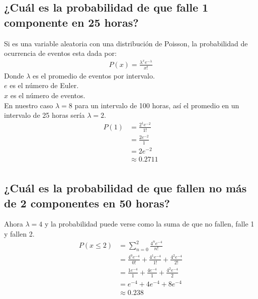 \documentclass[12pt]{article}
\begin{document}
\subsection{¿Cuál es la probabilidad de que falle 1 componente en 25 horas?}
Si es una variable aleatoria con una distribución de Poisson, la probabilidad de ocurrencia de eventos esta dada por:
\begin{equation}
	\begin{split}
		P(x)=\frac{\lambda^xe^{-\lambda}}{x!}
	\end{split}
\end{equation}
Donde $\lambda$ es el promedio de eventos por intervalo.\\
$e$ es el número de Euler.\\
$x$ es el número de eventos.\\
En nuestro caso $\lambda = 8$ para un intervalo de 100 horas, así el promedio en un intervalo de 25 horas sería $\lambda=2$.\\
\begin{equation}
	\begin{split}
	P(1) &= \frac{2^1e^{-2}}{1!}\\
	&= \frac{2e^{-2}}{1}\\
	&= 2e^{-2}\\
	&\approx 0.2711\\
	\end{split}
\end{equation}
\subsection{¿Cuál es la probabilidad de que fallen no más de 2 componentes en 50 horas?}
Ahora $\lambda=4$ y la probabilidad puede verse como la suma de que no fallen, falle 1 y fallen 2.\\
\begin{equation}
\begin{split}
P(x\leq2)&= \sum_{n=0}^{2} \frac{4^ne^{-4}}{n!}\\
 &= \frac{4^0e^{-4}}{0!} + \frac{4^1e^{-4}}{1!} + \frac{4^2e^{-4}}{2!}\\
&= \frac{1 e^{-4}}{1} + \frac{4e^{-4}}{1} + \frac{4^2e^{-4}}{2}\\
&= e^{-4} + 4e^{-4} + 8e^{-4}\\
&\approx 0.238\\
\end{split}
\end{equation}
\end{document}
